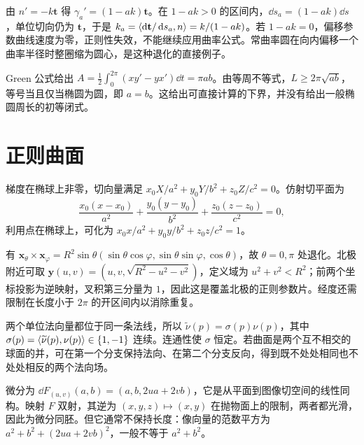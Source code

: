\begin{solve}
由 $n'=-k\mathbf t$ 得 $\gamma_a'=(1-ak)\mathbf t$。在 $1-ak>0$ 的区间内，$\dd s_a=(1-ak)\dd s$，单位切向仍为 $\mathbf t$，于是 $k_a=\langle \mathop{}\!\mathrm d\mathbf t/\mathop{}\!\mathrm d s_a,n\rangle=k/(1-ak)$。若 $1-ak=0$，偏移参数曲线速度为零，正则性失效，不能继续应用曲率公式。常曲率圆在向内偏移一个曲率半径时整圈缩为圆心，是这种退化的直接例子。
\end{solve}

\begin{solve}
Green 公式给出 $A=\frac12\int_0^{2\pi}(xy'-yx')\dd t=\pi ab$。由等周不等式，$L\ge2\pi\sqrt{ab}$，等号当且仅当椭圆为圆，即 $a=b$。这给出可直接计算的下界，并没有给出一般椭圆周长的初等闭式。
\end{solve}

\section{正则曲面}
\begin{solve}
梯度在椭球上非零，切向量满足 $x_0X/a^2+y_0Y/b^2+z_0Z/c^2=0$。仿射切平面为
\[
 \frac{x_0(x-x_0)}{a^2}+\frac{y_0(y-y_0)}{b^2}
 +\frac{z_0(z-z_0)}{c^2}=0,
\]
利用点在椭球上，可化为 $x_0x/a^2+y_0y/b^2+z_0z/c^2=1$。
\end{solve}

\begin{solve}
有 $\mathbf x_\theta\times\mathbf x_\varphi=R^2\sin\theta(\sin\theta\cos\varphi,\sin\theta\sin\varphi,\cos\theta)$，故 $\theta=0,\pi$ 处退化。北极附近可取 $\mathbf y(u,v)=(u,v,\sqrt{R^2-u^2-v^2})$，定义域为 $u^2+v^2<R^2$；前两个坐标投影为逆映射，叉积第三分量为 $1$，因此这是覆盖北极的正则参数片。经度还需限制在长度小于 $2\pi$ 的开区间内以消除重复。
\end{solve}

\begin{solve}
两个单位法向量都位于同一条法线，所以 $\widetilde\nu(p)=\sigma(p)\nu(p)$，其中 $\sigma(p)=\langle \widetilde\nu(p),\nu(p)\rangle\in\{1,-1\}$ 连续。连通性使 $\sigma$ 恒定。若曲面是两个互不相交的球面的并，可在第一个分支保持法向、在第二个分支反向，得到既不处处相同也不处处相反的两个法向场。
\end{solve}

\begin{solve}
微分为 $\dd F_{(u,v)}(a,b)=(a,b,2ua+2vb)$，它是从平面到图像切空间的线性同构。映射 $F$ 双射，其逆为 $(x,y,z)\mapsto(x,y)$ 在抛物面上的限制，两者都光滑，因此为微分同胚。但它通常不保持长度：像向量的范数平方为 $a^2+b^2+(2ua+2vb)^2$，一般不等于 $a^2+b^2$。
\end{solve}

